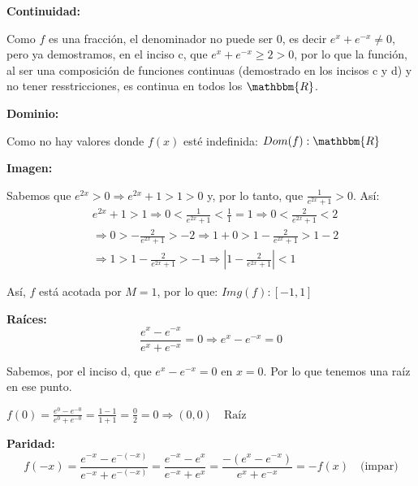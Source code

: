 \documentclass[12pt]{article}
\begin{document}
\begin{enumerate}[\hspace{9px} a)]
        \textbf{Continuidad: }\medskip

            Como \(f\) es una fracci\'on, el denominador no puede ser 0, es decir \(e^x+e^{-x}\neq0\), pero ya demostramos, en el inciso c, que \(e^x+e^{-x}\geq2>0\), por lo que la funci\'on, al ser una composici\'on de funciones continuas (demostrado en los incisos c y d) y no tener resstricciones, es continua en todos los \(\mathbbm{R}\).\medskip

        \textbf{Dominio: }\medskip

            Como no hay valores donde $f(x)$ est\'e indefinida: \(Dom(f):\mathbbm{R}\)\medskip

        \textbf{Imagen: }\medskip

            Sabemos que \(e^{2x}>0 \Rightarrow e^{2x}+1>1>0\) y, por lo tanto, que \(\displaystyle\frac{1}{e^{2x}+1}>0\). As\'i:
            \begin{align*}
                &e^{2x}+1>1 \Longrightarrow 0<\frac{1}{e^{2x}+1}<\frac{1}{1}=1 \Longrightarrow  0<\frac{2}{e^{2x}+1}<2 \\
                &\Longrightarrow  0>-\frac{2}{e^{2x}+1}>-2 \Longrightarrow  1+0>1-\frac{2}{e^{2x}+1}>1-2 \\ 
                &\Longrightarrow  1>1-\frac{2}{e^{2x}+1}>-1 \Longrightarrow \left|1-\frac{2}{e^{2x}+1}\right|<1
            \end{align*}

            As\'i, $f$  est\'a acotada por $M=1$, por lo que: \(Img(f): [-1,1]\)\medskip

        \textbf{Ra\'ices: }
            \begin{equation*}
                \frac{e^x-e^{-x}}{e^x+e^{-x}}=0 \Longrightarrow e^x-e^{-x}=0
            \end{equation*}

            Sabemos, por el inciso d, que \(e^x-e^{-x}=0\) en \(x=0\). Por lo que tenemos una ra\'iz en ese punto.\medskip

            \(f(0)=\frac{e^0-e^{-0}}{e^0+e^{-0}} = \frac{1-1}{1+1} = \frac{0}{2} = 0 \Longrightarrow (0,0) \quad \text{Raíz}\)

        \textbf{Paridad: }
            \begin{equation*}
                f(-x) = \frac{e^{-x}-e^{-(-x)}}{e^{-x}+e^{-(-x)}} = \frac{e^{-x}-e^x}{e^{-x}+e^x} = \frac{-(e^x-e^{-x})}{e^x+e^{-x}} = -f(x) \quad \text{(impar)}
            \end{equation*}


\end{enumerate}
\end{document}
